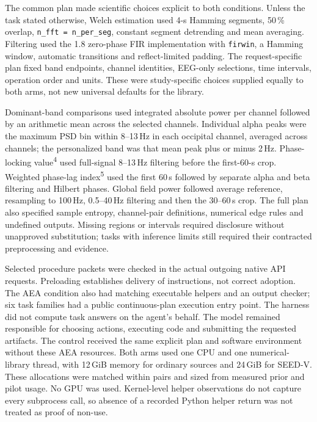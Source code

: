 The common plan made scientific choices explicit to both conditions. Unless the task stated otherwise, Welch estimation used 4-s Hamming segments, 50\,\% overlap, \texttt{n\_fft = n\_per\_seg}, constant segment detrending and mean averaging. Filtering used the \mne{} 1.8 zero-phase FIR implementation with \texttt{firwin}, a Hamming window, automatic transitions and reflect-limited padding. The request-specific plan fixed band endpoints, channel identities, EEG-only selections, time intervals, operation order and units. These were study-specific choices supplied equally to both arms, not new universal defaults for the library.

Dominant-band comparisons used integrated absolute power per channel followed by an arithmetic mean across the selected channels. Individual alpha peaks were the maximum PSD bin within 8--13\,Hz in each occipital channel, averaged across channels; the personalized band was that mean peak plus or minus 2\,Hz. Phase-locking value\textsuperscript{4} used full-signal 8--13\,Hz filtering before the first-60-s crop. Weighted phase-lag index\textsuperscript{5} used the first 60\,s followed by separate alpha and beta filtering and Hilbert phases. Global field power followed average reference, resampling to 100\,Hz, 0.5--40\,Hz filtering and then the 30--60\,s crop. The full plan also specified sample entropy, channel-pair definitions, numerical edge rules and undefined outputs. Missing regions or intervals required disclosure without unapproved substitution; tasks with inference limits still required their contracted preprocessing and evidence.

Selected procedure packets were checked in the actual outgoing native API requests. Preloading establishes delivery of instructions, not correct adoption. The AEA condition also had matching executable helpers and an output checker; six task families had a public continuous-plan execution entry point. The harness did not compute task answers on the agent's behalf. The model remained responsible for choosing actions, executing code and submitting the requested artifacts. The control received the same explicit plan and software environment without these AEA resources. Both arms used one CPU and one numerical-library thread, with 12\,GiB memory for ordinary sources and 24\,GiB for SEED-V. These allocations were matched within pairs and sized from measured prior and pilot usage. No GPU was used. Kernel-level helper observations do not capture every subprocess call, so absence of a recorded Python helper return was not treated as proof of non-use.

